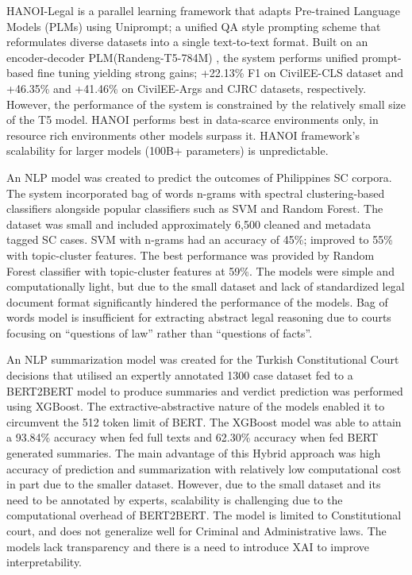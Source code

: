 HANOI-Legal is a parallel learning framework that adapts Pre-trained Language Models (PLMs) using Uniprompt; a unified QA style prompting scheme that reformulates diverse datasets into a single text-to-text format. Built on an encoder-decoder PLM(Randeng-T5-784M) \cite{b22}, the system performs unified prompt-based fine tuning yielding strong gains; +22.13\% F1 on CivilEE-CLS dataset and +46.35\% and +41.46\% on CivilEE-Args and CJRC datasets, respectively. However, the performance of the system is constrained by the relatively small size of the T5 model. HANOI performs best in data-scarce environments only, in resource rich environments other models surpass it. HANOI framework’s scalability for larger models (100B+ parameters) is unpredictable. 





An NLP model was created to predict the outcomes of Philippines SC corpora. The system incorporated bag of words n-grams with spectral clustering-based classifiers alongside popular classifiers such as SVM and Random Forest. The dataset was small and included approximately 6,500 cleaned and metadata tagged SC cases. SVM with n-grams had an accuracy of 45\%; improved to 55\% with topic-cluster features\cite{b23}. The best performance was provided by Random Forest classifier with topic-cluster features at 59\%. The models were simple and computationally light, but due to the small dataset and lack of standardized legal document format significantly hindered the performance of the models. Bag of words model is insufficient for extracting abstract legal reasoning due to courts focusing on “questions of law” rather than “questions of facts”.





An NLP summarization model was created for the Turkish Constitutional Court decisions that utilised an expertly annotated 1300 case dataset fed to a BERT2BERT model to produce summaries and verdict prediction was performed using XGBoost. The extractive-abstractive nature of the models enabled it to circumvent the 512 token limit of BERT. The XGBoost model was able to attain a 93.84\%\cite{b24} accuracy when fed full texts and 62.30\% accuracy when fed BERT generated summaries. The main advantage of this Hybrid approach was high accuracy of prediction and summarization with relatively low computational cost in part due to the smaller dataset. However, due to the small dataset and its need to be annotated by experts, scalability is challenging due to the computational overhead of BERT2BERT. The model is limited to Constitutional court, and does not generalize well for Criminal and Administrative laws. The models lack transparency and there is a need to introduce XAI to improve interpretability.



